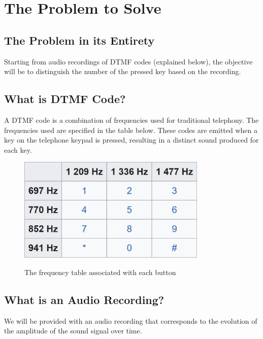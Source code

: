 \section{The Problem to Solve}
\subsection{The Problem in its Entirety}
Starting from audio recordings of DTMF codes (explained below), the objective will be to distinguish the number of the pressed key based on the recording.

\subsection{What is DTMF Code?}
A DTMF code is a combination of frequencies used for traditional telephony. The frequencies used are specified in the table below. These codes are emitted when a key on the telephone keypad is pressed, resulting in a distinct sound produced for each key.

\begin{figure}[H]
\begin{center}
\includegraphics[height=5cm]{img/fig.jpg}\\
\caption{The frequency table associated with each button}
\end{center}
\end{figure}

\subsection{What is an Audio Recording?}
We will be provided with an audio recording that corresponds to the evolution of the amplitude of the sound signal over time.
